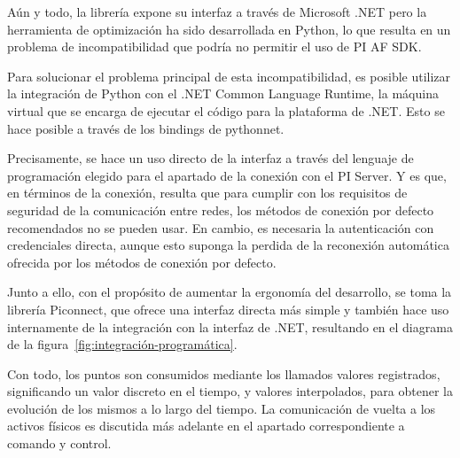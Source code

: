 Aún y todo, la librería expone su interfaz a través de Microsoft .NET pero la herramienta de optimización ha sido desarrollada en Python, lo que resulta en un problema de incompatibilidad que podría no permitir el uso de PI AF SDK.

Para solucionar el problema principal de esta incompatibilidad, es posible utilizar la integración de Python con el .NET Common Language Runtime, la máquina virtual que se encarga de ejecutar el código para la plataforma de .NET. Esto se hace posible a través de los bindings de pythonnet.

Precisamente, se hace un uso directo de la interfaz a través del lenguaje de programación elegido para el apartado de la conexión con el PI Server. Y es que, en términos de la conexión, resulta que para cumplir con los requisitos de seguridad de la comunicación entre redes, los métodos de conexión por defecto recomendados no se pueden usar. En cambio, es necesaria la autenticación con credenciales directa, aunque esto suponga la perdida de la reconexión automática ofrecida por los métodos de conexión por defecto.

Junto a ello, con el propósito de aumentar la ergonomía del desarrollo, se toma la librería Piconnect, que ofrece una interfaz directa más simple y también hace uso internamente de la integración con la interfaz de .NET, resultando en el diagrama de la figura~\ref{fig:integración-programática}.

Con todo, los puntos son consumidos mediante los llamados valores registrados, significando un valor discreto en el tiempo, y valores interpolados, para obtener la evolución de los mismos a lo largo del tiempo. La comunicación de vuelta a los activos físicos es discutida más adelante en el apartado correspondiente a comando y control.
